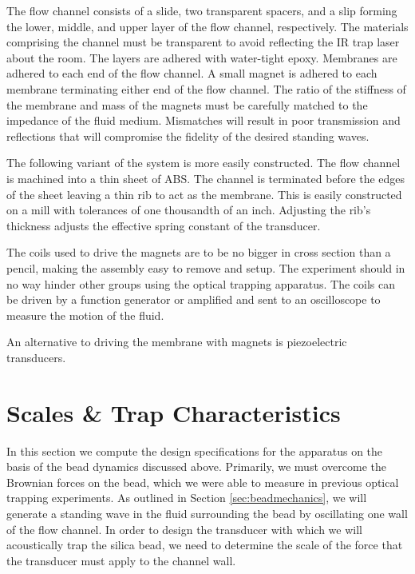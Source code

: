 The flow channel consists of a slide, two transparent spacers, and a slip forming the lower, middle, and upper layer of the flow channel, respectively.  The materials comprising the channel must be transparent to avoid reflecting the IR trap laser about the room. The layers are adhered with water-tight epoxy.  Membranes are adhered to each end of the flow channel.  A small magnet is adhered to each membrane terminating either end of the flow channel. The ratio of the stiffness of the membrane and mass of the magnets must be carefully matched to the impedance of the fluid medium.  Mismatches will result in poor transmission and reflections that will compromise the fidelity of the desired standing waves.

    The following variant of the system is more easily constructed.  The flow channel is machined into a thin sheet of ABS.  The channel is terminated before the edges of the sheet leaving a thin rib to act as the membrane.  This is easily constructed on a mill with tolerances of one thousandth of an inch.  Adjusting the rib's thickness adjusts the effective spring constant of the transducer.  

The coils used to drive the magnets are to be no bigger in cross section than a pencil, making the assembly easy to remove and setup.  The experiment should in no way hinder other groups using the optical trapping apparatus.  The coils can be driven by a function generator or amplified and sent to an oscilloscope to measure the motion of the fluid.

An alternative to driving the membrane with magnets is piezoelectric transducers.

\section{Scales \& Trap Characteristics}

In this section we compute the design specifications for the apparatus on the basis of the bead dynamics discussed above. Primarily, we must overcome the Brownian forces on the bead, which we were able to measure in previous optical trapping experiments\cite{optTrappingPaper}. As outlined in Section \ref{sec:beadmechanics}, we will generate a standing wave in the fluid surrounding the bead by oscillating one wall of the flow channel. In order to design the transducer with which we will acoustically trap the silica bead, we need to determine the scale of the force that the transducer must apply to the channel wall. 

